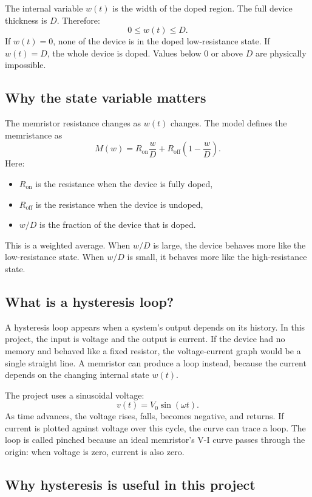\documentclass[11pt]{article}
\begin{document}
The internal variable \(w(t)\) is the width of the doped region. The full device thickness is \(D\). Therefore:
\[
0 \leq w(t) \leq D.
\]
If \(w(t)=0\), none of the device is in the doped low-resistance state. If \(w(t)=D\), the whole device is doped. Values below \(0\) or above \(D\) are physically impossible.

\subsection{Why the state variable matters}

The memristor resistance changes as \(w(t)\) changes. The model defines the memristance as
\[
M(w) = R_{\text{on}}\frac{w}{D}
       + R_{\text{off}}\left(1-\frac{w}{D}\right).
\]
Here:
\begin{itemize}[noitemsep]
  \item \(R_{\text{on}}\) is the resistance when the device is fully doped,
  \item \(R_{\text{off}}\) is the resistance when the device is undoped,
  \item \(w/D\) is the fraction of the device that is doped.
\end{itemize}

This is a weighted average. When \(w/D\) is large, the device behaves more like the low-resistance state. When \(w/D\) is small, it behaves more like the high-resistance state.

\subsection{What is a hysteresis loop?}

A hysteresis loop appears when a system's output depends on its history. In this project, the input is voltage and the output is current. If the device had no memory and behaved like a fixed resistor, the voltage-current graph would be a single straight line. A memristor can produce a loop instead, because the current depends on the changing internal state \(w(t)\).

The project uses a sinusoidal voltage:
\[
v(t) = V_0 \sin(\omega t).
\]
As time advances, the voltage rises, falls, becomes negative, and returns. If current is plotted against voltage over this cycle, the curve can trace a loop. The loop is called pinched because an ideal memristor's V-I curve passes through the origin: when voltage is zero, current is also zero.

\subsection{Why hysteresis is useful in this project}
\end{document}
